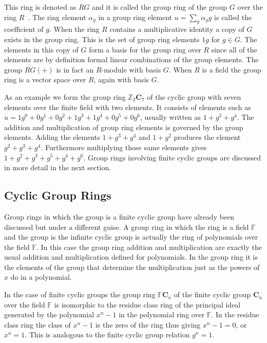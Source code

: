 This ring is denoted as $RG$ and it is called the group ring of the group $G$ over the ring $R$~\cite[p.~131]{mil02}.
The ring element $\alpha_g$ in a group ring element $u = \sum_g \alpha_g g$ is called the coefficient of $g$.
When the ring $R$ contains a multiplicative identity a copy of $G$ exists in the group ring.
This is the set of group ring elements $1g$ for $g \in G$.
The elements in this copy of $G$ form a basis for the group ring over $R$ since all of the elements are by definition formal linear combinations of the group elements.
The group $RG(+)$ is in fact an $R$-module with basis $G$.
When $R$ is a field the group ring is a vector space over $R$, again with basis $G$.

As an example we form the group ring ${\mathbb Z}_2 {\mathbf C}_7$ of the cyclic group with seven elements over the finite field with two elements.
It consists of elements such as $ u = 1 g^0 + 0 g^1 + 0 g^2 + 1 g^3 + 1 g^4 + 0 g^5 + 0 g^6$, usually written as $1 + g^3 + g^4$.
The addition and multiplication of group ring elements is governed by the group elements.
Adding the elements  $1 + g^3 + g^4$ and $1 + g^2$ produces the element $g^2 + g^3 + g^4$.
Furthermore multiplying those same elements gives $1 + g^2 + g^3 + g^5 + g^4 + g^6$.
Group rings involving finite cyclic groups are discussed in more detail in the next section.

\subsection{Cyclic Group Rings}
\label{sect:cyclicrgs}
Group rings in which the group is a finite cyclic group have already been discussed but under a different guise.
A group ring in which the ring is a field $\mathbb{F}$ and the group is the infinite cyclic group is actually the ring of polynomials over the field $\mathbb{F}$.
In this case the group ring addition and multiplication are exactly the usual addition and multiplication defined for polynomials.
In the group ring it is the elements of the group that determine the multiplication just as the powers of $x$ do in a polynomial.

In the case of finite cyclic groups the group ring $\mathbb{F} \mathbf{C}_n$ of the finite cyclic group $\mathbf{C}_n$ over the field $\mathbb{F}$ is isomorphic to the residue class ring of the principal ideal generated by the polynomial $x^n-1$ in the polynomial ring over $\mathbb{F}$.
In the residue class ring the class of $x^n-1$ is the zero of the ring thus giving $x^n - 1 =0$, or $x^n = 1$.
This is analogous to the finite cyclic group relation $g^n = 1$.

